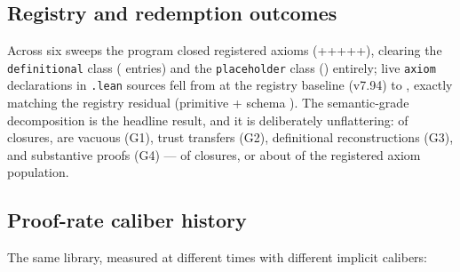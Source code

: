 
\subsection{Registry and redemption outcomes}
\label{sec:registry-results}
Across six sweeps the program closed  registered axioms
(+++++),
clearing the \texttt{definitional} class ( entries) and the
\texttt{placeholder} class () entirely; live \texttt{axiom}
declarations in \texttt{.lean} sources fell from  at the
registry baseline (v7.94) to , exactly matching the registry
residual (primitive  + schema ).
The semantic-grade decomposition is the headline result, and it is
deliberately unflattering: of  closures,  are
vacuous (G1),  trust transfers (G2),  definitional
reconstructions (G3), and  substantive proofs
(G4) ---  of closures, or about  of the
registered axiom population.

\subsection{Proof-rate caliber history}
\label{sec:history}
The same library, measured at different times with different implicit
calibers:

